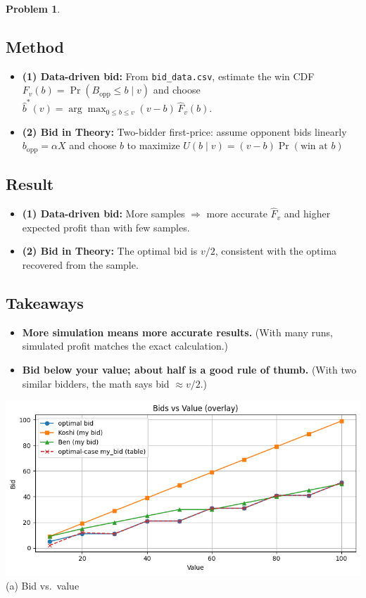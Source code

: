 \documentclass[11pt]{article}
\renewenvironment{shaded}{%
  \def\FrameCommand{\fboxsep=\FrameSep \colorbox{shadecolor}}%
  \MakeFramed{\advance\hsize-\width \FrameRestore\FrameRestore}}%
 {\endMakeFramed}
\newtheorem{problem}{Problem}
\begin{document}
\begin{problem}
\end{problem}

\begin{shaded}
\subsection*{Method}
\begin{itemize}
  \item \textbf{(1) Data-driven bid:} From \texttt{bid\_data.csv}, estimate the win CDF $F_v(b)=\Pr(B_{\text{opp}}\le b\mid v)$ and choose $\hat b^*(v)=\arg\max_{0\le b\le v}(v-b)\,\hat F_v(b)$.
  \item \textbf{(2) Bid in Theory:} Two-bidder first-price: assume opponent bids linearly $b_{\text{opp}}=\alpha X$ and choose $b$ to maximize $U(b\mid v)=(v-b)\Pr(\text{win at }b)$
\end{itemize}

\pagebreak

\subsection*{Result}


\begin{itemize}
  \item \textbf{(1) Data-driven bid:} More samples $\Rightarrow$ more accurate $\hat F_v$ and higher expected profit than with few samples.
  \item \textbf{(2) Bid in Theory:} The optimal bid is $v/2$, consistent with the optima recovered from the sample.
\end{itemize}

\subsection*{Takeaways}
\begin{itemize}
  \item \textbf{More simulation means more accurate results.} (With many runs, simulated profit matches the exact calculation.)
  \item \textbf{Bid below your value; about half is a good rule of thumb.} (With two similar bidders, the math says bid $\approx v/2$.)
\end{itemize}
\end{shaded}


\centering
\includegraphics[width=1\linewidth]{332Project1/figures/bid.png}
\vspace{0.4em}
{\footnotesize (a) Bid vs.\ value}
\end{document}
